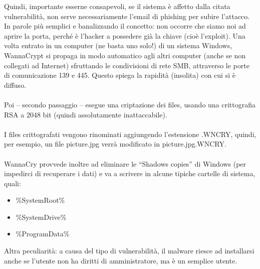 \documentclass{article}
\begin{document}
Quindi, importante esserne consapevoli, se il sistema è affetto dalla citata vulnerabilità, non serve 
necessariamente l’email di phishing per subire l’attacco. In parole più semplici e banalizzando il concetto: 
non occorre che siamo noi ad aprire la porta, perché è l’hacker a possedere già la chiave (cioè l’exploit). 
Una volta entrato in un computer (ne basta uno solo!) di un sistema Windows, WannaCrypt si propaga in modo 
automatico agli altri computer (anche se non collegati ad Internet) sfruttando le condivisioni di rete SMB, 
attraverso le porte di comunicazione 139 e 445. Questo spiega la rapidità (insolita) con cui si è diffuso.\\\\
Poi – secondo passaggio – esegue una criptazione dei files, usando una crittografia RSA a 2048 bit (quindi 
assolutamente inattaccabile).\\\\
I files crittografati vengono rinominati aggiungendo l’estensione .WNCRY, quindi, per esempio, un file 
picture.jpg verrà modificato in picture.jpg.WNCRY.\\\\
WannaCry provvede inoltre ad eliminare le “Shadows copies” di Windows (per impedirci di recuperare i dati) 
e va a scrivere in alcune tipiche cartelle di sistema, quali:
\begin{itemize}
    \item \%SystemRoot\%
    \item \%SystemDrive\%
    \item \%ProgramData\%
\end{itemize}
Altra peculiarità: a causa del tipo di vulnerabilità, il malware riesce ad installarsi anche se l’utente non 
ha diritti di amministratore, ma è un semplice utente.
\end{document}
